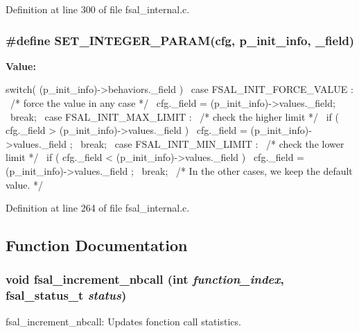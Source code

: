 Definition at line 300 of file fsal\_\-internal.c.
\subsubsection[{SET\_\-INTEGER\_\-PARAM}]{\setlength{\rightskip}{0pt plus 5cm}\#define SET\_\-INTEGER\_\-PARAM(cfg, \/  p\_\-init\_\-info, \/  \_\-field)}\label{fsal__internal_8c_a1338c45d33ed60654787c72596f36adc}
{\bfseries Value:}
\begin{DoxyCode}
switch( (p_init_info)->behaviors._field ){                    \
    case FSAL_INIT_FORCE_VALUE :                                  \
      /* force the value in any case */                           \
      cfg._field = (p_init_info)->values._field;                  \
      break;                                                      \
    case FSAL_INIT_MAX_LIMIT :                                    \
      /* check the higher limit */                                \
      if ( cfg._field > (p_init_info)->values._field )            \
        cfg._field = (p_init_info)->values._field ;               \
      break;                                                      \
    case FSAL_INIT_MIN_LIMIT :                                    \
      /* check the lower limit */                                 \
      if ( cfg._field < (p_init_info)->values._field )            \
        cfg._field = (p_init_info)->values._field ;               \
      break;                                                      \
    /* In the other cases, we keep the default value. */          \
    }
\end{DoxyCode}


Definition at line 264 of file fsal\_\-internal.c.

\subsection{Function Documentation}
\subsubsection[{fsal\_\-increment\_\-nbcall}]{\setlength{\rightskip}{0pt plus 5cm}void fsal\_\-increment\_\-nbcall (int {\em function\_\-index}, \/  fsal\_\-status\_\-t {\em status})}\label{fsal__internal_8c_a79dcb2ba7f283a1ba5c6010d76fa88f1}
fsal\_\-increment\_\-nbcall: Updates fonction call statistics.


